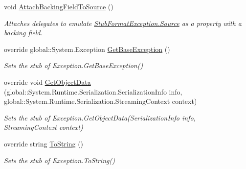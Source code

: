 \begin{DoxyCompactItemize}
void \hyperlink{class_system_1_1_fakes_1_1_stub_format_exception_afa2081f1fb6144a0874f49982fa6ee88}{Attach\-Backing\-Field\-To\-Source} ()
\begin{DoxyCompactList}\small\item\em Attaches delegates to emulate \hyperlink{class_system_1_1_fakes_1_1_stub_format_exception_a5ae12133fc73e1aa019722b40ed3a0c1}{Stub\-Format\-Exception.\-Source} as a property with a backing field.\end{DoxyCompactList}\item 
override global\-::\-System.\-Exception \hyperlink{class_system_1_1_fakes_1_1_stub_format_exception_a9afdd41a477b85b163fcd196f67e3bea}{Get\-Base\-Exception} ()
\begin{DoxyCompactList}\small\item\em Sets the stub of Exception.\-Get\-Base\-Exception()\end{DoxyCompactList}\item 
override void \hyperlink{class_system_1_1_fakes_1_1_stub_format_exception_a570cd804ed5f743b43bf8ae8fc93eb35}{Get\-Object\-Data} (global\-::\-System.\-Runtime.\-Serialization.\-Serialization\-Info info, global\-::\-System.\-Runtime.\-Serialization.\-Streaming\-Context context)
\begin{DoxyCompactList}\small\item\em Sets the stub of Exception.\-Get\-Object\-Data(\-Serialization\-Info info, Streaming\-Context context)\end{DoxyCompactList}\item 
override string \hyperlink{class_system_1_1_fakes_1_1_stub_format_exception_a48e87880ad71587eae319fdf5bcac6c3}{To\-String} ()
\begin{DoxyCompactList}\small\item\em Sets the stub of Exception.\-To\-String()\end{DoxyCompactList}\end{DoxyCompactItemize}

